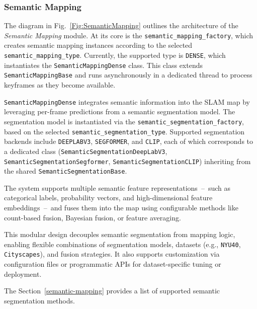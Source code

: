\documentclass{article}
\begin{document}
\subsubsection{Semantic Mapping}

The diagram in Fig.~\ref{Fig:SemanticMapping} outlines the architecture of the \textit{Semantic Mapping} module. At its core is the \texttt{semantic\_mapping\_factory}, which creates semantic mapping instances according to the selected \texttt{semantic\_mapping\_type}. Currently, the supported type is \texttt{DENSE}, which instantiates the \texttt{SemanticMappingDense} class. This class extends \texttt{SemanticMappingBase} and runs asynchronously in a dedicated thread to process keyframes as they become available.

\texttt{SemanticMappingDense} integrates semantic information into the SLAM map by leveraging per-frame predictions from a semantic segmentation model. The segmentation model is instantiated via the \texttt{semantic\_segmentation\_factory}, based on the selected \texttt{semantic\_segmentation\_type}. Supported segmentation backends include \texttt{DEEPLABV3}, \texttt{SEGFORMER}, and \texttt{CLIP}, each of which corresponds to a dedicated class (\texttt{SemanticSegmentationDeepLabV3}, \texttt{SemanticSegmentationSegformer}, \texttt{SemanticSegmentationCLIP}) inheriting from the shared \texttt{SemanticSegmentationBase}.

The system supports multiple semantic feature representations~--~such as categorical labels, probability vectors, and high-dimensional feature embeddings~--~and fuses them into the map using configurable methods like count-based fusion, Bayesian fusion, or feature averaging.

This modular design decouples semantic segmentation from mapping logic, enabling flexible combinations of segmentation models, datasets (e.g., \texttt{NYU40}, \texttt{Cityscapes}), and fusion strategies. It also supports customization via configuration files or programmatic APIs for dataset-specific tuning or deployment.

The Section~\ref{semantic-mapping} provides a list of supported semantic segmentation methods.





%
\end{document}

